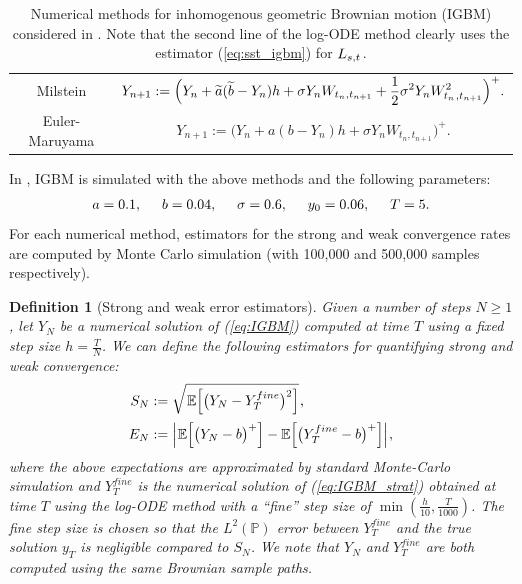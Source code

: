 \documentclass[sn-mathphys-num]{sn-jnl}%
\newtheorem{definition}{Definition}%
\newcommand{\E}{\mathbb{E}}
\newcommand{\m}{\hspace{0.25mm}}
\newcommand{\mm}{\hspace{5mm}}
\begin{document}
\begin{table}[ht]
\begin{tabular}{@{}cc@{}}
    Milstein &  \hspace{-8.5mm}$\displaystyle Y_{n+1} := \Big(Y_n + \widetilde{a}(\widetilde{b}-Y_n)h + \sigma Y_n W_{t_n,t_{n+1}} + \frac{1}{2}\sigma^2 Y_n W_{t_n\m,t_{n+1}}^2\Big)^{+}.$ \\[8pt] 
    Euler-Maruyama  &  \hspace{-33.75mm}$\displaystyle Y_{n+1} := \Big(Y_n + a(b-Y_n)h + \sigma Y_n W_{t_n,t_{n+1}}\Big)^{+}.$ \\[4pt] 
     \bottomrule
    \end{tabular}\medbreak
    \caption{Numerical methods for inhomogenous geometric Brownian motion (IGBM) considered in \cite{foster2020poly}. Note that the second line of the log-ODE method clearly uses the estimator (\ref{eq:sst_igbm}) for $L_{s,t}\m$.}\label{tab:igbm_methods}
\end{table}

In \cite{foster2020poly}, IGBM is simulated with the above methods and the following parameters:
\begin{align*}
a = 0.1,\mm b = 0.04,\mm \sigma = 0.6,\mm y_0 = 0.06,\mm T = 5.
\end{align*}
For each numerical method, estimators for the strong and weak convergence rates are computed by Monte Carlo simulation (with 100,000 and 500,000 samples respectively). \medbreak

\begin{definition}[Strong and weak error estimators] Given a number of steps $N\geq 1$, let $Y_{N}$
be a numerical solution of (\ref{eq:IGBM}) computed at time $T$ using a fixed step size $h = \frac{T}{N}$.
We can define the following estimators for quantifying strong and weak convergence: \label{def:igbm_error}
\begin{align}
S_N & := \sqrt{\m\E\Big[\big(Y_N - Y_T^{fine}\big)^2\Big]}\m,\label{eq:igbm_strong}\\
E_N & := \Big|\m\E\Big[\big(Y_N - b\big)^{+}\Big] - \E\Big[\big(Y_T^{fine} - b\big)^{+}\Big]\Big|\m,\label{eq:igbm_weak}
\end{align}
where the above expectations are approximated by standard Monte-Carlo simulation
and $Y_{T}^{fine}$ is the numerical solution of (\ref{eq:IGBM_strat}) obtained at time $T$ using the log-ODE method
with a ``{\m}fine'' step size of $\min\left(\frac{h}{10}, \frac{T}{1000}\right)$. The fine step size is chosen so that the
$L^{2}(\mathbb{P})$ error between $Y_{T}^{fine}$ and the true solution $y_T$ is negligible compared to $S_{N}$.
We note that $Y_{N}$ and $Y_{T}^{fine}$ are both computed using the same Brownian sample paths.
\end{definition}\medbreak
\end{document}
